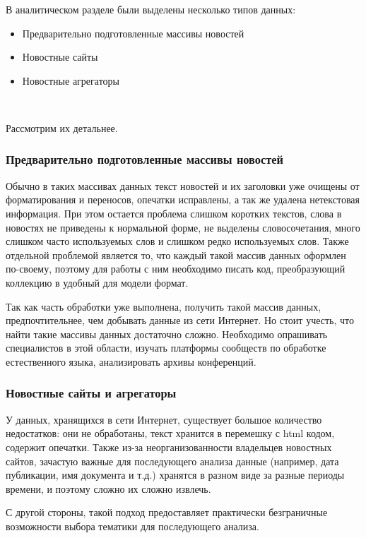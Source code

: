 В аналитическом разделе были выделены несколько типов данных: 

\begin{itemize}
    \item Предварительно подготовленные массивы новостей 
    \item Новостные сайты
    \item Новостные агрегаторы
\end{itemize}

~\

Рассмотрим их детальнее. 

%
\subsubsection{Предварительно подготовленные массивы новостей}

Обычно в таких массивах данных текст новостей и их заголовки уже очищены от форматирования и переносов, опечатки исправлены, а так же удалена нетекстовая информация. При этом остается проблема слишком коротких текстов, слова в новостях не приведены к нормальной форме, не выделены словосочетания, много слишком часто используемых слов и слишком редко используемых слов. Также отдельной проблемой является то, что каждый такой массив данных оформлен по-своему, поэтому для работы с ним необходимо писать код, преобразующий коллекцию в удобный для модели формат.

Так как часть обработки уже выполнена, получить такой массив данных, предпочтительнее, чем добывать данные из сети Интернет. Но стоит учесть, что найти такие массивы данных достаточно сложно. Необходимо опрашивать специалистов в этой области, изучать платформы сообществ по обработке естественного языка, анализировать архивы конференций.

%
\subsubsection{Новостные сайты и агрегаторы}

У данных, хранящихся в сети Интернет, существует большое количество недостатков: они не обработаны, текст хранится в перемешку с html кодом, содержит опечатки. Также из-за неорганизованности владельцев новостных сайтов, зачастую важные для последующего анализа данные (например, дата публикации, имя документа и т.д.) хранятся в разном виде за разные периоды времени, и поэтому сложно их сложно извлечь. 

С другой стороны, такой подход предоставляет практически безграничные возможности выбора тематики для последующего анализа.

